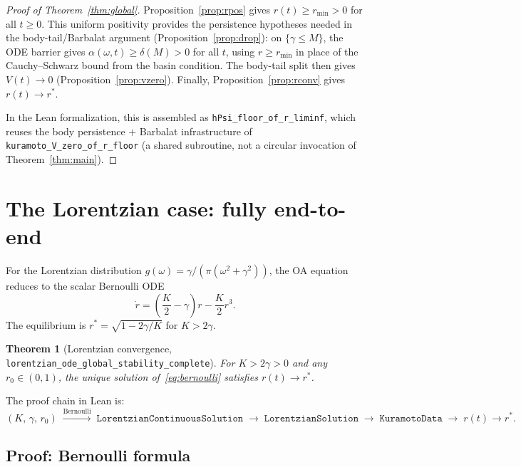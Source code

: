 \documentclass[11pt,a4paper]{article}
\newtheorem{theorem}{Theorem}[section]
\theoremstyle{definition}
\begin{document}
\begin{proof}[Proof of Theorem~\ref{thm:global}]
Proposition~\ref{prop:rpos} gives $r(t) \geq r_{\min} > 0$ for all $t \geq 0$. This uniform positivity provides the persistence hypotheses needed in the body-tail/Barbalat argument (Proposition~\ref{prop:drop}): on $\{\gamma \leq M\}$, the ODE barrier gives $\alpha(\omega,t) \geq \delta(M) > 0$ for all $t$, using $r \geq r_{\min}$ in place of the Cauchy--Schwarz bound from the basin condition. The body-tail split then gives $V(t) \to 0$ (Proposition~\ref{prop:vzero}). Finally, Proposition~\ref{prop:rconv} gives $r(t) \to r^*$.

In the Lean formalization, this is assembled as \texttt{hPsi\_floor\_of\_r\_liminf}, which reuses the body persistence $+$ Barbalat infrastructure of \texttt{kuramoto\_V\_zero\_of\_r\_floor} (a shared subroutine, not a circular invocation of Theorem~\ref{thm:main}).
\end{proof}

\section{The Lorentzian case: fully end-to-end}\label{sec:lorentzian}

For the Lorentzian distribution $g(\omega) = \gamma/(\pi(\omega^2+\gamma^2))$, the OA equation reduces to the scalar Bernoulli ODE
\begin{equation}\label{eq:bernoulli}
\dot{r} = \left(\frac{K}{2} - \gamma\right)r - \frac{K}{2}r^3.
\end{equation}
The equilibrium is $r^* = \sqrt{1 - 2\gamma/K}$ for $K > 2\gamma$.

\begin{theorem}[Lorentzian convergence, \texttt{lorentzian\_ode\_global\_stability\_complete}]\label{thm:lorentzian}
For $K > 2\gamma > 0$ and any $r_0 \in (0,1)$, the unique solution of~\eqref{eq:bernoulli} satisfies $r(t) \to r^*$.
\end{theorem}

The proof chain in Lean is:
\[
(K,\,\gamma,\,r_0) \;\xrightarrow{\text{Bernoulli}}\; \texttt{LorentzianContinuousSolution} \;\to\; \texttt{LorentzianSolution} \;\to\; \texttt{KuramotoData} \;\to\; r(t) \to r^*.
\]

\subsection{Proof: Bernoulli formula}\label{sec:bernoulli}
\end{document}
